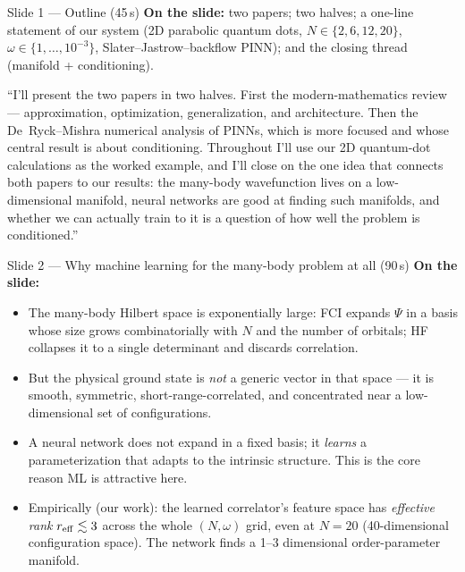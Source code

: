 \documentclass[11pt]{article}
\begin{document}
\begin{slide}{Slide 1 --- Outline (45\,s)}
\textbf{On the slide:} two papers; two halves; a one-line statement of our system
(2D parabolic quantum dots, $N\in\{2,6,12,20\}$, $\omega\in\{1,\dots,10^{-3}\}$,
Slater--Jastrow--backflow PINN); and the closing thread (manifold + conditioning).
\end{slide}

\begin{say}
``I'll present the two papers in two halves. First the modern-mathematics review --- approximation,
optimization, generalization, and architecture. Then the De~Ryck--Mishra numerical analysis of
PINNs, which is more focused and whose central result is about conditioning. Throughout I'll use
our 2D quantum-dot calculations as the worked example, and I'll close on the one idea that connects
both papers to our results: the many-body wavefunction lives on a low-dimensional manifold, neural
networks are good at finding such manifolds, and whether we can actually train to it is a question
of how well the problem is conditioned.''
\end{say}

\begin{slide}{Slide 2 --- Why machine learning for the many-body problem at all (90\,s)}
\textbf{On the slide:}
\begin{itemize}[leftmargin=*]
\item The many-body Hilbert space is exponentially large: FCI expands $\Psi$ in a basis whose
size grows combinatorially with $N$ and the number of orbitals; HF collapses it to a single
determinant and discards correlation.
\item But the physical ground state is \emph{not} a generic vector in that space --- it is smooth,
symmetric, short-range-correlated, and concentrated near a low-dimensional set of configurations.
\item A neural network does not expand in a fixed basis; it \emph{learns} a parameterization that
adapts to the intrinsic structure. This is the core reason ML is attractive here.
\item Empirically (our work): the learned correlator's feature space has \emph{effective rank
$r_{\rm eff}\lesssim 3$} across the whole $(N,\omega)$ grid, even at $N{=}20$ (40-dimensional
configuration space). The network finds a 1--3 dimensional order-parameter manifold.
\end{itemize}
\end{slide}
\end{document}
